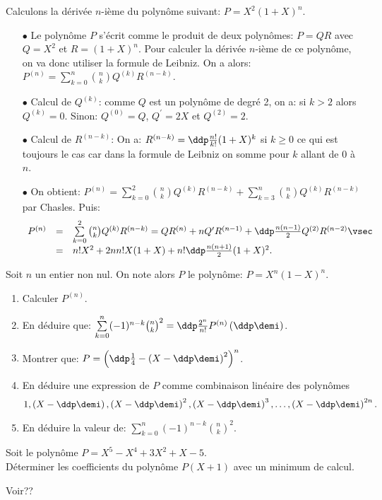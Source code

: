 \documentclass[a4paper, 11pt,reqno]{article}
\begin{document}
\begin{correction}
	Calculons la d\'eriv\'ee $n$-i\`eme du polyn\^ome suivant: $P=X^2(1+X)^n.$
	\begin{itemize}
		\item[$\bullet$] Le polyn\^{o}me $P$ s'\'ecrit comme le produit de deux polyn\^{o}mes: $P=QR$ avec $Q=X^2$ et $R=(1+X)^n$. Pour calculer la d\'eriv\'ee $n$-i\`{e}me de ce polyn\^{o}me, on va donc utiliser la formule de Leibniz. On a alors:
		      $P^{(n)}=\sum\limits_{k=0}^n \binom{n}{k} Q^{(k)} R^{(n-k)}$.
		\item[$\bullet$] Calcul de $Q^{(k)}$: comme $Q$ est un polyn\^{o}me de degr\'e 2, on a: si $k>2$ alors $Q^{(k)}=0$. Sinon: $Q^{(0)}=Q$, $Q^{\prime}=2X$ et $Q^{(2)}=2$.
		\item[$\bullet$] Calcul de $R^{(n-k)}$: On a: $R^{(n-k)}=\ddp\frac{n!}{k!}(1+X)^k$ si $k\geq 0$ ce qui est toujours le cas car dans la formule de Leibniz on somme pour $k$ allant de 0 \`{a} $n$.
		\item[$\bullet$] On obtient: $P^{(n)}=\sum\limits_{k=0}^2 \binom{n}{k} Q^{(k)} R^{(n-k)}+\sum\limits_{k=3}^n \binom{n}{k} Q^{(k)} R^{(n-k)}$ par Chasles. Puis:
		      $$ \begin{array}{lll}P^{(n)}&=&\sum\limits_{k=0}^2 \binom{n}{k} Q^{(k)} R^{(n-k)}=QR^{(n)}+nQ^{\prime}R^{(n-1)}+\ddp\frac{n(n-1)}{2} Q^{(2)}R^{(n-2)}\vsec\\ &=& n!X^2+2nn!X(1+X)+n!\ddp\frac{n(n+1)}{2}(1+X)^2.\end{array}$$
	\end{itemize}
\end{correction}



\begin{exercice}
	Soit $n$ un entier non nul. On note alors $P$ le polyn\^ome: $P=X^n(1-X)^n$.
	\begin{enumerate}
		\item Calculer $P^{(n)}$.
		\item En d\'eduire que: $\sum\limits_{k=0}^n (-1)^{n-k}\binom{n}{k}^2= \ddp\frac{2^n}{n!}P^{(n)}\left( \ddp\demi \right) $.
		\item Montrer que: $P=\left( \ddp\frac{1}{4}-\left(X-\ddp\demi\right)^2  \right)^n$.
		\item En d\'eduire une expression de $P$ comme combinaison lin\'eaire des polyn\^omes
		      $$1,\left(X-\ddp\demi\right),\left(X-\ddp\demi\right)^2,\left(X-\ddp\demi\right)^3,\dots,\left(X-\ddp\demi\right)^{2n}.$$
		\item En d\'eduire la valeur de: $\sum\limits_{k=0}^n (-1)^{n-k} \binom{n}{k}^2$.
	\end{enumerate}
\end{exercice}
\begin{exercice}
	Soit le polyn\^ome $P=X^5-X^4+3X^2+X-5$.\\
	\noindent D\'eterminer les coefficients du polyn\^ome $P(X+1)$ avec un minimum de calcul.
\end{exercice}
\begin{correction}
	Voir??
\end{correction}
\end{document}
